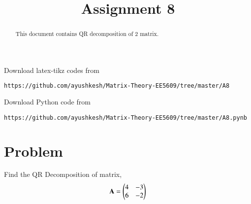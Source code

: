 \documentclass[journal,12pt,twocolumn]{IEEEtran}
\begin{document}
\makeatletter
{}
\makeatother
\let\StandardTheFigure\thefigure
\let\vec\mathbf
\renewcommand{\thefigure}{\theproblem}
\def\putbox#1#2#3{\makebox[0in][l]{\makebox[#1][l]{}\raisebox{\baselineskip}[0in][0in]{\raisebox{#2}[0in][0in]{#3}}}}
     \def\rightbox#1{\makebox[0in][r]{#1}}
     \def\centbox#1{\makebox[0in]{#1}}
     \def\topbox#1{\raisebox{-\baselineskip}[0in][0in]{#1}}
\vspace{3cm}
\title{Assignment 8}
\maketitle
\newpage
\bigskip
\renewcommand{\thefigure}{\theenumi}
\renewcommand{\thetable}{\theenumi}
\begin{abstract}
This document contains QR decomposition of 2 matrix.
\end{abstract}
Download latex-tikz codes from 
%
\begin{lstlisting}
https://github.com/ayushkesh/Matrix-Theory-EE5609/tree/master/A8
\end{lstlisting}
Download  Python code from 
%
\begin{lstlisting}
https://github.com/ayushkesh/Matrix-Theory-EE5609/tree/master/A8.pynb
\end{lstlisting}
\section{Problem}
Find the QR Decomposition of matrix,
\begin{align}
\vec{A} = \myvec{4&-3\\6&-2}
\label{Q}
\end{align}
\end{document}
